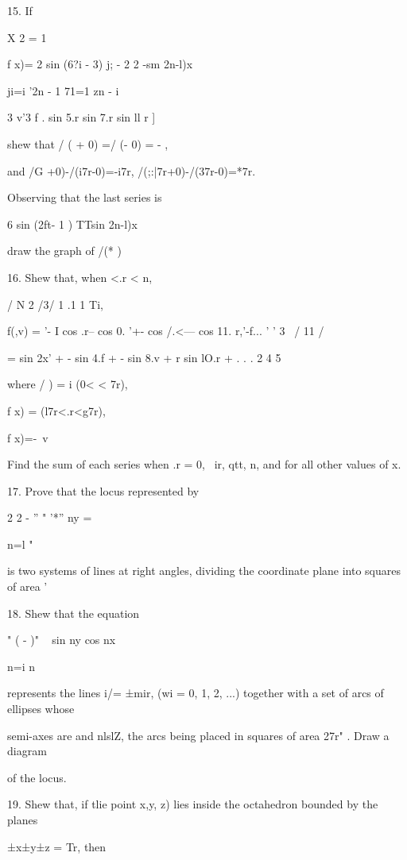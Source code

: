 %
%

15. If

X 2 = 1

f x)= 2 sin (6?i - 3) j; - 2 2 -sm 2n-l)x

ji=i '2n - 1 71=1 zn - i

3 v'3 f . sin 5.r sin 7.r sin ll r ]

shew that / ( + 0) =/ (\pi - 0) = - \pi,

and /G +0)-/(i7r-0)=-i7r, /(;:|7r+0)-/(37r-0)=*7r.

Observing that the last series is

6 sin (2ft- 1 ) TTsin 2n-l)x

draw the graph of /(* ) 

16. Shew that, when <.r < n,

 / N 2 /3/ 1 .1 1 Ti, \

f(,v) = '- I cos .r-- cos 0. '+- cos /.<--- cos 11. r,'-f... ' ' 3 \
/ 11 /

= sin 2x' + - sin 4.f + - sin 8.v + r sin lO.r + . . . 2 4 5

where / ) = i (0< < 7r),

f x) = (l7r<.r<g7r),

f x)=-\ v %

Find the sum of each series when .r = 0, \ ir, qtt, n, and for all
other values of x.


17. Prove that the locus represented by

2 2 - '' " '*'' ny =

n=l "

is two systems of lines at right angles, dividing the coordinate plane
into squares of area \pi'\ \addexamplecitation{Math. Trip. 1895.}

18. Shew that the equation

" ( - )" ~ sin ny cos nx \

n=i n ~

represents the lines i/= ±mir, (wi = 0, 1, 2, ...) together with a set
of arcs of ellipses whose

semi-axes are \pi and nlslZ, the arcs being placed in squares of area
27r" . Draw a diagram

of the locus. 

19. Shew that, if tlie point x,y, z) lies inside the octahedron
bounded by the planes

±x±y±z = Tr, then

